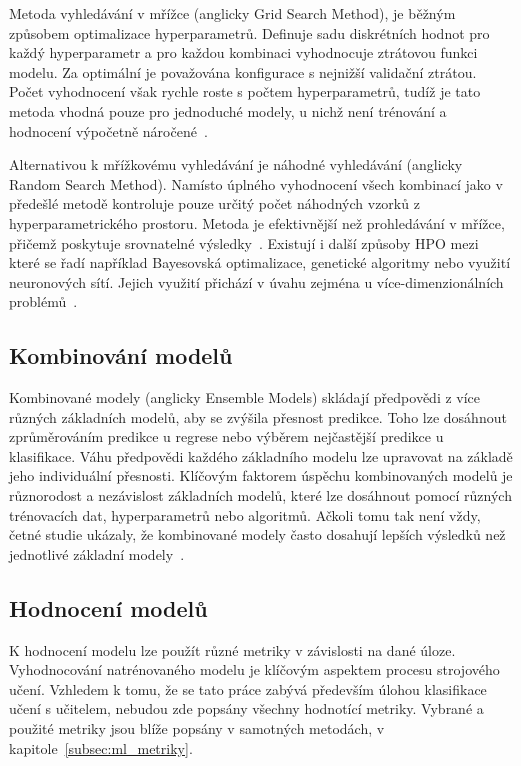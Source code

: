 Metoda vyhledávání v mřížce (anglicky Grid Search Method), je běžným způsobem
optimalizace hyperparametrů. Definuje sadu diskrétních hodnot pro každý
hyperparametr a pro každou kombinaci vyhodnocuje ztrátovou funkci modelu. Za
optimální je považována konfigurace s nejnižší validační ztrátou. Počet
vyhodnocení však rychle roste s počtem hyperparametrů, tudíž je tato metoda
vhodná pouze pro jednoduché modely, u nichž není trénování a hodnocení
výpočetně náročené~\cite{Liashchynskyi2019}.

Alternativou k mřížkovému vyhledávání je náhodné vyhledávání (anglicky Random
Search Method). Namísto úplného vyhodnocení všech kombinací jako v předešlé
metodě kontroluje pouze určitý počet náhodných vzorků z hyperparametrického
prostoru. Metoda je efektivnější než prohledávání v mřížce, přičemž poskytuje
srovnatelné výsledky~\cite{anggoro2021,bergstra2012,Liashchynskyi2019}. Existují
i další způsoby HPO mezi které se řadí například Bayesovská optimalizace,
genetické algoritmy nebo využití neuronových sítí. Jejich využití přichází v
úvahu zejména u více-dimenzionálních
problémů~\cite{Alibrahim2021,Liashchynskyi2019}.

\subsection{Kombinování modelů}
Kombinované modely (anglicky Ensemble Models) skládají předpovědi z více různých
základních modelů, aby se zvýšila přesnost predikce. Toho lze dosáhnout
zprůměrováním predikce u regrese nebo výběrem nejčastější predikce u
klasifikace. Váhu předpovědi každého základního modelu lze upravovat na základě
jeho individuální přesnosti. Klíčovým faktorem úspěchu kombinovaných modelů je
různorodost a nezávislost základních modelů, které lze dosáhnout pomocí různých
trénovacích dat, hyperparametrů nebo algoritmů. Ačkoli tomu tak není vždy, četné
studie ukázaly, že kombinované modely často dosahují lepších výsledků než
jednotlivé základní modely~\cite{Parker2013}.

\subsection{Hodnocení modelů}
K hodnocení modelu lze použít různé metriky v závislosti na dané úloze.
Vyhodnocování natrénovaného modelu je klíčovým aspektem procesu strojového
učení. Vzhledem k tomu, že se tato práce zabývá především úlohou klasifikace
učení s učitelem, nebudou zde popsány všechny hodnotící metriky. Vybrané a
použité metriky jsou blíže popsány v samotných metodách, v
kapitole~\ref{subsec:ml_metriky}.

